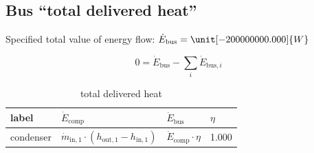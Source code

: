 \subsection{Bus ``total delivered heat''}

Specified total value of energy flow: $\dot{E}_\mathrm{bus} = \unit[-200000000.000]{W}$

\begin{equation}
\label{eq:Bus_energy_flow_sum}
0=\dot{E}_\mathrm{bus} -\sum_i \dot{E}_{\mathrm{bus,}i}
\end{equation}

\begin{table}[H]\begin{center}
\begin{tabular}{llll}
\toprule
     label &                                                         $\dot{E}_\mathrm{comp}$ &              $\dot{E}_\mathrm{bus}$ & $\eta$ \\
\midrule
 condenser &  $\dot{m}_\mathrm{in,1} \cdot \left(h_\mathrm{out,1} - h_\mathrm{in,1} \right)$ &  $\dot{E}_\mathrm{comp} \cdot \eta$ &  1.000 \\
\bottomrule
\end{tabular}
\caption{total delivered heat}
\end{center}\end{table}




